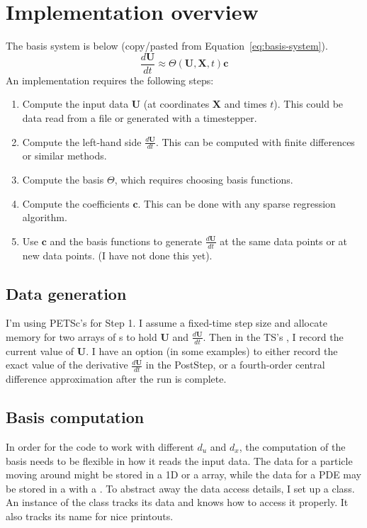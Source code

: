 \documentclass{article}
\let\vec\mathbf
\def\lstinline#1{}%
\begin{document}
\pagebreak
\section{Implementation overview}

The basis system is below (copy/pasted from Equation~\ref{eq:basis-system}).
\begin{equation}
\frac{d\vec{U}}{dt} \approx \Theta(\vec{U}, \vec{X}, t) \vec{c}
\end{equation}
An implementation requires the following steps:
\begin{enumerate}
    \item Compute the input data $\vec{U}$ (at coordinates $\vec{X}$ and times $t$). This could be data read from a file or generated with a timestepper.
    \item Compute the left-hand side $\frac{d\vec{U}}{dt}$. This can be computed with finite differences or similar methods.
    \item Compute the basis $\Theta$, which requires choosing basis functions.
    \item Compute the coefficients $\vec{c}$. This can be done with any sparse regression algorithm.
    \item Use $\vec{c}$ and the basis functions to generate $\frac{d\vec{U}}{dt}$ at the same data points or at new data points. (I have not done this yet).
\end{enumerate}

\subsection{Data generation}

I'm using PETSc's \lstinline{TS} for Step 1. I assume a fixed-time step size and
allocate memory for two arrays of \lstinline{Vec}s to hold $\vec{U}$ and
$\frac{d\vec{U}}{dt}$. Then in the TS's \lstinline{PostStep}, I record the
current value of $\vec{U}$. I have an option (in some examples) to either record
the exact value of the derivative $\frac{d\vec{U}}{dt}$ in the PostStep, or a
fourth-order central difference approximation after the run is complete.


\subsection{Basis computation}

In order for the code to work with different $d_u$ and $d_x$, the computation of
the basis needs to be flexible in how it reads the input data. The data
for a particle moving around might be stored in a 1D \lstinline{Vec} or a
\lstinline{PetscScalar} array, while the data for a PDE may be stored in a
\lstinline{Vec} with a \lstinline{DMDA}. To abstract away the data access
details, I set up a \lstinline{Variable} class. An instance of the class tracks
its data and knows how to access it properly. It also tracks its name for nice
printouts.
\end{document}
